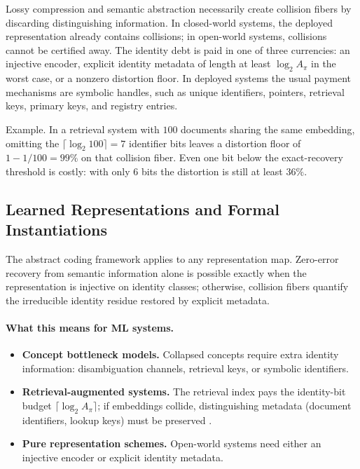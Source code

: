 Lossy compression and semantic abstraction necessarily create collision fibers by discarding distinguishing information. In closed-world systems, the deployed representation already contains collisions; in open-world systems, collisions cannot be certified away. The identity debt is paid in one of three currencies: an injective encoder, explicit identity metadata of length at least $\log_2 A_\pi$ in the worst case, or a nonzero distortion floor. In deployed systems the usual payment mechanisms are symbolic handles, such as unique identifiers, pointers, retrieval keys, primary keys, and registry entries.

Example. In a retrieval system with $100$ documents sharing the same embedding, omitting the $\lceil \log_2 100 \rceil = 7$ identifier bits leaves a distortion floor of $1-1/100 = 99\%$ on that collision fiber. Even one bit below the exact-recovery threshold is costly: with only $6$ bits the distortion is still at least $36\%$.

\subsection{Learned Representations and Formal Instantiations}

The abstract coding framework applies to any representation map. Zero-error recovery from semantic information alone is possible exactly when the representation is injective on identity classes; otherwise, collision fibers quantify the irreducible identity residue restored by explicit metadata.

\paragraph{What this means for ML systems.}
\begin{itemize}
\item \textbf{Concept bottleneck models.} Collapsed concepts require extra identity information: disambiguation channels, retrieval keys, or symbolic identifiers.
\item \textbf{Retrieval-augmented systems.} The retrieval index pays the identity-bit budget $\lceil \log_2 A_\pi \rceil$; if embeddings collide, distinguishing metadata (document identifiers, lookup keys) must be preserved \cite{lewis2020retrieval}.
\item \textbf{Pure representation schemes.} Open-world systems need either an injective encoder or explicit identity metadata.
\end{itemize}

